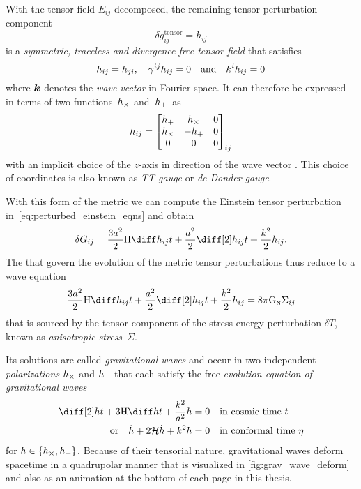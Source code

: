 With the tensor field \(E_{ij}\) decomposed, the remaining tensor perturbation component
\begin{equation}
	\delta g^{\mathrm{tensor}}_{ij} = h_{ij}
\end{equation}
is a \emph{symmetric, traceless and divergence-free tensor field} that satisfies
\begin{equation}
	h_{ij} = h_{ji} \mathpunct{,} \quad \gamma^{ij}h_{ij} = 0 \quad \text{and} \quad k^i h_{ij} = 0
\end{equation}
where \(\boldsymbol{k}\) denotes the \emph{wave vector} in Fourier space. It can therefore be expressed in terms of two functions~\(h_\times\) and~\(h_+\)~as
\begin{equation}
	h_{ij} =
	\begin{bmatrix}
		h_+ & h_\times & 0 \\
		h_\times & -h_+ & 0 \\
		0 & 0 & 0
	\end{bmatrix}_{ij}
\end{equation}
with an implicit choice of the \(z\)-axis in direction of the wave vector \autocite{Dodelson}. This choice of coordinates is also known as \emph{TT-gauge} or \emph{de Donder gauge}.

With this form of the metric we can compute the Einstein tensor perturbation in~\eqref{eq:perturbed_einstein_eqns} and obtain \autocite{Dodelson}
\begin{align}\label{eq:evolution}
	\delta\Gtens_{ij} = \frac{3 a^2}{2} \Hcosm \dt{h_{ij}} + \frac{a^2}{2}\ddt{h_{ij}} + \frac{k^2}{2}h_{ij}
	\eqpunct{.}
\end{align}
The  that govern the evolution of the metric tensor perturbations thus reduce to a wave equation
\begin{equation}
	\frac{3 a^2}{2} \Hcosm \dt{h_{ij}} + \frac{a^2}{2}\ddt{h_{ij}} + \frac{k^2}{2}h_{ij} = 8\pi\Newtconst \Sigma_{ij}
\end{equation}
that is sourced by the tensor component of the stress-energy perturbation \(\delta T\), known as \emph{anisotropic stress}~\(\Sigma\).

Its solutions are called \emph{gravitational waves} and occur in two independent \emph{polarizations} \(h_\times\) and \(h_+\) that each satisfy the free \emph{evolution equation of gravitational waves}%
\begin{subequations}\label{eq:grav_waves_evolution}%
\begin{align}%
	\ddt{h} + 3 \Hcosm \dt{h} + \frac{k^2}{a^2} h &= 0 \quad \text{in cosmic time \(t\)} \\
	\text{or} \quad \ddconf{h} + 2 \Hconf \dconf{h} + k^2 h &= 0 \quad \text{in conformal time \(\conft\)} \label{eq:grav_waves_evolution_conft}
\end{align}
\end{subequations}
for \(h \in \cbr{\hcross, \hplus}\). Because of their tensorial nature, gravitational waves deform spacetime in a quadrupolar manner \autocite{Schutz} that is visualized in \autoref{fig:grav_wave_deform} and also as an animation at the bottom of each page in this thesis.

